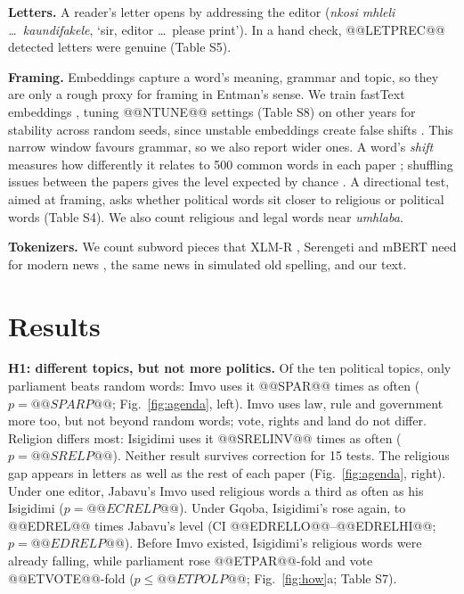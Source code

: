 \documentclass[10pt,letterpaper]{article}
\begin{document}
\textbf{Letters.} A reader's letter opens by addressing the editor (\emph{nkosi mhleli \dots\ kaundifakele}, `sir, editor \dots\ please print'). In a hand check, @@LETPREC@@ detected letters were genuine (Table S5).

\textbf{Framing.} Embeddings capture a word's meaning, grammar and topic, so they are only a rough proxy for framing in Entman's sense. We train fastText embeddings \citep{bojanowski2017}, tuning @@NTUNE@@ settings (Table S8) on other years for stability across random seeds, since unstable embeddings create false shifts \citep{antoniak2018}. This narrow window favours grammar, so we also report wider ones. A word's \emph{shift} measures how differently it relates to 500 common words in each paper \citep{hamilton2016b}; shuffling issues between the papers gives the level expected by chance \citep{dubossarsky2017}. A directional test, aimed at framing, asks whether political words sit closer to religious or political words (Table S4). We also count religious and legal words near \emph{umhlaba}.

\textbf{Tokenizers.} We count subword pieces that XLM-R \citep{conneau2020}, Serengeti \citep{adebara2023} and mBERT \citep{devlin2019} need for modern news \citep{adelani2023}, the same news in simulated old spelling, and our text.

\section{Results}
\textbf{H1: different topics, but not more politics.} Of the ten political topics, only parliament beats random words: Imvo uses it @@SPAR@@ times as often ($p=@@SPARP@@$; Fig.~\ref{fig:agenda}, left). Imvo uses law, rule and government more too, but not beyond random words; vote, rights and land do not differ. Religion differs most: Isigidimi uses it @@SRELINV@@ times as often ($p=@@SRELP@@$). Neither result survives correction for 15 tests. The religious gap appears in letters as well as the rest of each paper (Fig.~\ref{fig:agenda}, right). Under one editor, Jabavu's Imvo used religious words a third as often as his Isigidimi ($p=@@ECRELP@@$). Under Gqoba, Isigidimi's rose again, to @@EDREL@@ times Jabavu's level (CI @@EDRELLO@@--@@EDRELHI@@; $p=@@EDRELP@@$). Before Imvo existed, Isigidimi's religious words were already falling, while parliament rose @@ETPAR@@-fold and vote @@ETVOTE@@-fold ($p\leq@@ETPOLP@@$; Fig.~\ref{fig:how}a; Table S7).
\end{document}
